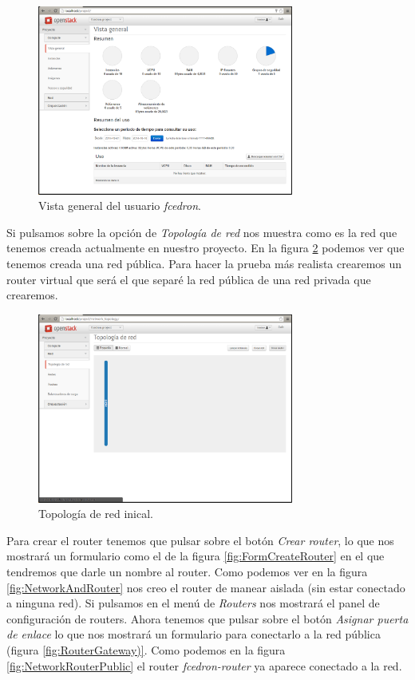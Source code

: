 \documentclass{article}
\begin{document}
\begin{figure}[h]
  \centering
    \includegraphics[width=0.75\textwidth]{img/m_010.png}
  \caption{Vista general del usuario \emph{fcedron}.}
  \label{fig:UserFcedron}
\end{figure}

	Si pulsamos sobre la opción de \emph{Topología de red} nos muestra como es la red que tenemos creada actualmente en nuestro proyecto. En la figura \ref{fig:NetworkInit} podemos ver que tenemos creada una red pública. Para hacer la prueba más realista crearemos un router virtual que será el que separé la red pública de una red privada que crearemos.

\begin{figure}[h]
  \centering
    \includegraphics[width=0.75\textwidth]{img/m_011.png}
  \caption{Topología de red inical.}
  \label{fig:NetworkInit}
\end{figure}

	Para crear el router tenemos que pulsar sobre el botón \emph{Crear router}, lo que nos mostrará un formulario como el de la figura \ref{fig:FormCreateRouter} en el que tendremos que darle un nombre al router. Como podemos ver en la figura \ref{fig:NetworkAndRouter} nos creo el router de manear aislada (sin estar conectado a ninguna red). Si pulsamos en el menú de \emph{Routers} nos mostrará el panel de configuración de routers. Ahora tenemos que pulsar sobre el botón \emph{Asignar puerta de enlace} lo que nos mostrará un formulario para conectarlo a la red pública (figura \ref{fig:RouterGateway)}. Como podemos en la figura \ref{fig:NetworkRouterPublic} el router \emph{fcedron-router} ya aparece conectado a la red.
	
\end{document}

